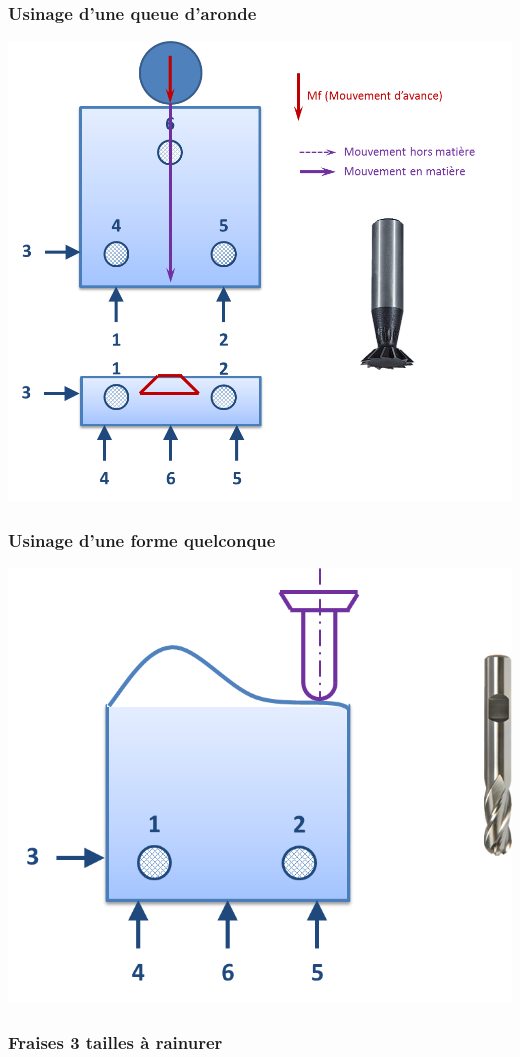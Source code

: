 \documentclass[11pt,oneside]{article}
\begin{document}
\subsubsection{Usinage d'une queue d'aronde}
\begin{center}
\includegraphics[width=.6\textwidth]{png/op_aronde}
\end{center}

\subsubsection{Usinage d'une forme quelconque}
\begin{center}
\includegraphics[width=.6\textwidth]{png/op_qq}
\end{center}

\subsubsection{Fraises 3 tailles à rainurer}
\end{document}
